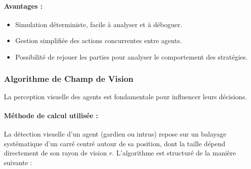 \paragraph{Avantages :}
\begin{itemize}
    \item Simulation déterministe, facile à analyser et à déboguer.
    \item Gestion simplifiée des actions concurrentes entre agents.
    \item Possibilité de rejouer les parties pour analyser le comportement des stratégies.
\end{itemize}

\subsubsection{ Algorithme de Champ de Vision }

La perception visuelle des agents est fondamentale pour influencer leurs décisions.
\paragraph{Méthode de calcul utilisée :}

La détection visuelle d'un agent (gardien ou intrus) repose sur un balayage systématique d'un carré centré autour de sa position, dont la taille dépend directement de son rayon de vision $r$. L'algorithme est structuré de la manière suivante :

